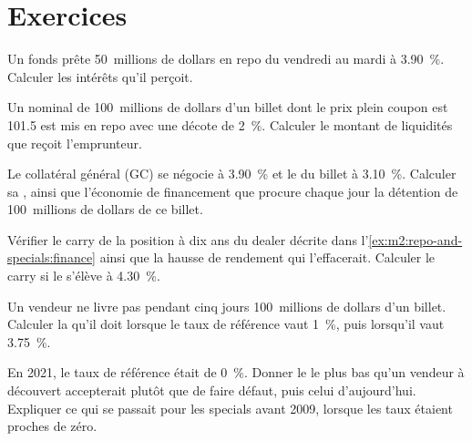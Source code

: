 \section{Exercices}

\begin{exercise}[$\star$]\label{exo:m2:repo-and-specials:1}
Un fonds prête 50~millions de dollars en repo du vendredi au mardi à 3.90~\%. Calculer
les intérêts qu'il perçoit.
\end{exercise}

\begin{exercise}[$\star$]\label{exo:m2:repo-and-specials:2}
Un nominal de 100~millions de dollars d'un billet dont le prix plein coupon est 101.5 est mis en
repo avec une décote de 2~\%. Calculer le montant de liquidités que reçoit l'emprunteur.
\end{exercise}

\begin{exercise}[$\star$]\label{exo:m2:repo-and-specials:3}
Le collatéral général (GC) se négocie à 3.90~\% et le  du billet à 3.10~\%. Calculer
sa , ainsi que l'économie de financement que procure chaque jour la détention
de 100~millions de dollars de ce billet.
\end{exercise}

\begin{exercise}[$\star\star$]\label{exo:m2:repo-and-specials:4}
Vérifier le carry de la position à dix ans du dealer décrite dans
l'\cref{ex:m2:repo-and-specials:finance} ainsi que la hausse de rendement qui l'effacerait.
Calculer le carry si le  s'élève à 4.30~\%.
\end{exercise}

\begin{exercise}[$\star\star$]\label{exo:m2:repo-and-specials:5}
Un vendeur ne livre pas pendant cinq jours 100~millions de dollars d'un billet. Calculer la
 qu'il doit lorsque le taux de référence vaut 1~\%, puis lorsqu'il vaut 3.75~\%.
\end{exercise}

\begin{exercise}[$\star\star$]\label{exo:m2:repo-and-specials:6}
En 2021, le taux de référence était de 0~\%. Donner le  le plus bas
qu'un vendeur à découvert accepterait plutôt que de faire défaut, puis celui d'aujourd'hui.
Expliquer ce qui se passait pour les specials avant 2009, lorsque les taux étaient proches de zéro.
\end{exercise}

